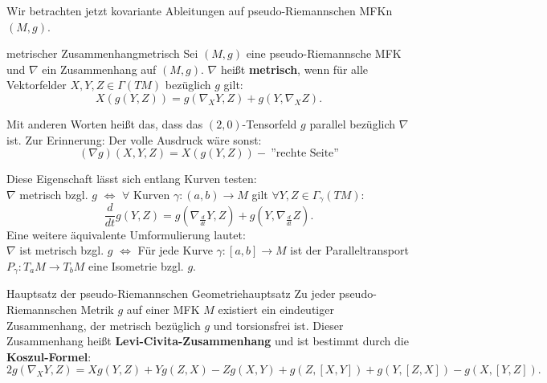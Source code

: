 Wir betrachten jetzt kovariante Ableitungen auf pseudo-Riemannschen MFKn $(M, g)$.
\begin{definition}{metrischer Zusammenhang}{metrisch}
Sei $(M,g)$ eine pseudo-Riemannsche MFK und $\nabla$ ein Zusammenhang auf $(M,g)$. $\nabla$ heißt \textbf{metrisch}, wenn für alle Vektorfelder $X,Y,Z \in \Gamma(TM)$ bezüglich $g$ gilt:
\begin{equation}
X(g(Y,Z)) = g(\nabla_X Y, Z) + g(Y, \nabla_X Z).
\end{equation}
\end{definition}
Mit anderen Worten heißt das, dass das $(2,0)$-Tensorfeld $g$ parallel bezüglich $\nabla$ ist. Zur Erinnerung: Der volle Ausdruck wäre sonst:
\begin{equation}
(\nabla g)(X,Y,Z)=X(g(Y,Z)) - \ \text{''rechte Seite''}
\end{equation}
\begin{bemerkung}
Diese Eigenschaft lässt sich entlang Kurven testen: \\
$\nabla$ metrisch bzgl. $g$ $\iff$ $\forall$ Kurven $\gamma: (a,b) \to M$ gilt $\forall Y,Z \in \Gamma_\gamma (TM)$:
\begin{equation}
\frac{d}{dt} g(Y,Z) = g(\nabla_\frac{d}{dt} Y, Z) + g (Y, \nabla_\frac{d}{dt} Z).
\end{equation}
Eine weitere äquivalente Umformulierung lautet:\\
$\nabla$ ist metrisch bzgl. $g$ $\iff$ Für jede Kurve $\gamma: [a,b] \to M$ ist der Paralleltransport $P_\gamma: T_aM \to T_bM$ eine Isometrie bzgl. $g$.
\end{bemerkung}
\begin{theorem}{Hauptsatz der pseudo-Riemannschen Geometrie}{hauptsatz}
Zu jeder pseudo-Riemannschen Metrik $g$ auf einer MFK $M$ existiert ein eindeutiger Zusammenhang, der metrisch bezüglich $g$ und torsionsfrei ist. Dieser Zusammenhang heißt \textbf{Levi-Civita-Zusammenhang} und ist bestimmt durch die \textbf{Koszul-Formel}:
\begin{equation}
2g(\nabla_X Y, Z) = X g(Y,Z) + Y g(Z,X) - Zg(X,Y) + g(Z, [X,Y]) + g(Y, [Z,X]) - g(X, [Y,Z]).
\end{equation}
\end{theorem}
